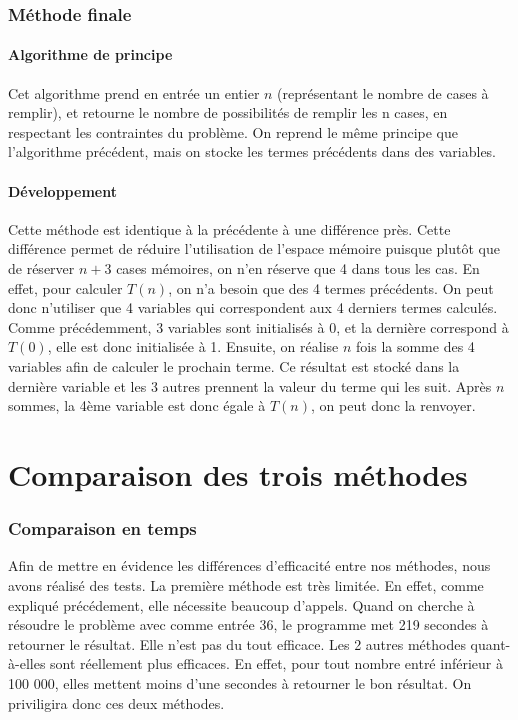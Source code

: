 \documentclass{article}
\begin{document}
\section{Méthode finale}

\subsection{Algorithme de principe}

Cet algorithme prend en entrée un entier $n$ (représentant le nombre de cases à remplir), et retourne le nombre de possibilités de remplir les n cases, en respectant les contraintes du problème. On reprend le même principe que l'algorithme précédent, mais on stocke les termes précédents dans des variables.
\bigbreak


\subsection{Développement}
Cette méthode est identique à la précédente à une différence près. Cette différence permet de réduire l'utilisation de l'espace mémoire puisque plutôt que de réserver $n+3$ cases mémoires, on n'en réserve que 4 dans tous les cas. En effet, pour calculer $T(n)$, on n'a besoin que des 4 termes précédents. On peut donc n'utiliser que 4 variables qui correspondent aux 4 derniers termes calculés. Comme précédemment, 3 variables sont initialisés à 0, et la dernière correspond à $T(0)$, elle est donc initialisée à 1. Ensuite, on réalise $n$ fois la somme des 4 variables afin de calculer le prochain terme. Ce résultat est stocké dans la dernière variable et les 3 autres prennent la valeur du terme qui les suit. Après $n$ sommes, la 4ème variable est donc égale à $T(n)$, on peut donc la renvoyer.
\newpage
\part{Comparaison des trois méthodes}
\section{Comparaison en temps}
Afin de mettre en évidence les différences d'efficacité entre nos méthodes, nous avons réalisé des tests. La première méthode est très limitée. En effet, comme expliqué précédement, elle nécessite beaucoup d'appels. Quand on cherche à résoudre le problème avec comme entrée 36, le programme met 219 secondes à retourner le résultat. Elle n'est pas du tout efficace. Les 2 autres méthodes quant-à-elles sont réellement plus efficaces. En effet, pour tout nombre entré inférieur à 100 000, elles mettent moins d'une secondes à retourner le bon résultat. On priviligira donc ces deux méthodes.
\end{document}
